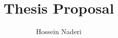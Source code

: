 \documentclass[12pt]{article}
\begin{document}
\title{Thesis Proposal}
\author{Hossein Naderi}
\maketitle

\end{document}
